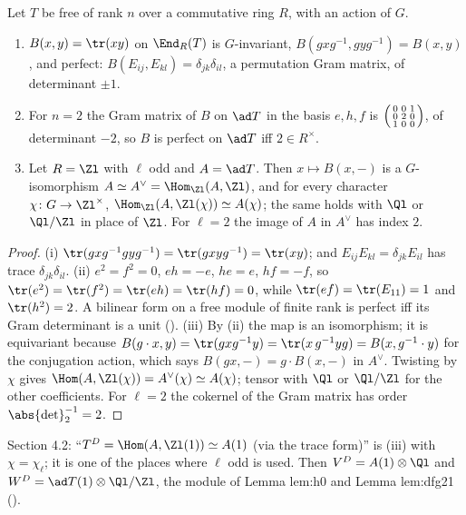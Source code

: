 \begin{proposition}\label{prop:reps:trace-form}
Let $T$ be free of rank $n$ over a commutative ring $R$, with an action of $G$.
\begin{enumerate}[label=(\roman*)]
\item $B(x,y)=\tr(xy)$ on $\End_R(T)$ is $G$-invariant, $B(gxg^{-1},gyg^{-1})=B(x,y)$, and perfect: $B(E_{ij},E_{kl})=\delta_{jk}\delta_{il}$, a permutation Gram
matrix, of determinant $\pm1$.
\item For $n=2$ the Gram matrix of $B$ on $\ad T$ in the basis $e,h,f$ is $\begin{psmallmatrix}0&0&1\\0&2&0\\1&0&0\end{psmallmatrix}$, of determinant $-2$, so $B$ is
perfect on $\ad T$ iff $2\in R^\times$.
\item Let $R=\Zl$ with $\ell$ odd and $A=\ad T$. Then $x\mapsto B(x,{-})$ is a $G$-isomorphism $A\simeq A^\vee=\Hom_{\Zl}(A,\Zl)$, and for every character
$\chi\colon G\to\Zl^\times$, $\Hom_{\Zl}(A,\Zl(\chi))\simeq A(\chi)$; the same holds with $\Ql$ or $\Ql/\Zl$ in place of $\Zl$. For $\ell=2$ the image of
$A$ in $A^\vee$ has index $2$.
\end{enumerate}
\end{proposition}

\begin{proof}
(i) $\tr(gxg^{-1}gyg^{-1})=\tr(gxyg^{-1})=\tr(xy)$; and $E_{ij}E_{kl}=\delta_{jk}E_{il}$ has trace $\delta_{jk}\delta_{il}$. (ii) $e^2=f^2=0$, $eh=-e$, $he=e$,
$hf=-f$, so $\tr(e^2)=\tr(f^2)=\tr(eh)=\tr(hf)=0$, while $\tr(ef)=\tr(E_{11})=1$ and $\tr(h^2)=2$. A bilinear form on a free module of finite rank is
perfect iff its Gram determinant is a unit (). (iii) By (ii) the map is an isomorphism; it is equivariant because
$B(g\cdot x,y)=\tr(gxg^{-1}y)=\tr(x\,g^{-1}yg)=B(x,g^{-1}\cdot y)$ for the conjugation action, which says $B(gx,{-})=g\cdot B(x,{-})$ in $A^\vee$. Twisting by $\chi$ gives
$\Hom(A,\Zl(\chi))=A^\vee(\chi)\simeq A(\chi)$; tensor with $\Ql$ or $\Ql/\Zl$ for the other coefficients. For $\ell=2$ the cokernel of the Gram matrix
has order $\abs{\det}_2^{-1}=2$.
\end{proof}

\begin{paperlink}
Section 4.2: ``$T^D=\Hom(A,\Zl(1))\simeq A(1)$ (via the trace form)'' is (iii) with $\chi=\chi_\ell$; it is one of the places where $\ell$ odd is used.
Then $V^D=A(1)\otimes\Ql$ and $W^D=\ad T(1)\otimes\Ql/\Zl$, the module of Lemma lem:h0 and Lemma lem:dfg21 ().
\end{paperlink}

